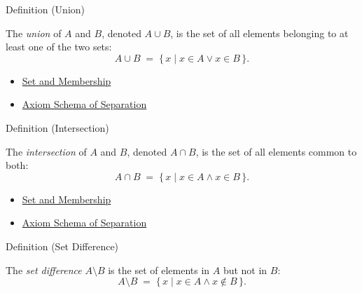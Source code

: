 \begin{definitionbox}{Definition (Union)}
\begin{definition}[Union]\label{def:union}
The \emph{union} of $A$ and $B$, denoted $A \cup B$, is the set of all
elements belonging to at least one of the two sets:
\[
A \cup B \;=\; \{\, x \mid x \in A \lor x \in B \,\}.
\]
\end{definition}
\end{definitionbox}

\begin{dependencies}
\begin{itemize}
  \item \hyperref[def:set-membership]{Set and Membership}
  \item \hyperref[ax:separation]{Axiom Schema of Separation}
\end{itemize}
\end{dependencies}



\begin{definitionbox}{Definition (Intersection)}
\begin{definition}[Intersection]\label{def:intersection}
The \emph{intersection} of $A$ and $B$, denoted $A \cap B$, is the set of all
elements common to both:
\[
A \cap B \;=\; \{\, x \mid x \in A \land x \in B \,\}.
\]
\end{definition}
\end{definitionbox}

\begin{dependencies}
\begin{itemize}
  \item \hyperref[def:set-membership]{Set and Membership}
  \item \hyperref[ax:separation]{Axiom Schema of Separation}
\end{itemize}
\end{dependencies}



\begin{definitionbox}{Definition (Set Difference)}
\begin{definition}\label{def:set-difference}
The \emph{set difference} $A \setminus B$ is the set of elements in $A$ but
not in $B$:
\[
A \setminus B \;=\; \{\, x \mid x \in A \land x \notin B \,\}.
\]
\end{definition}
\end{definitionbox}

